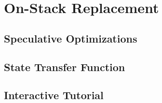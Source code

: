\chapter{On-Stack Replacement}

\section{Speculative Optimizations}

\section{State Transfer Function}

\section{Interactive Tutorial}
